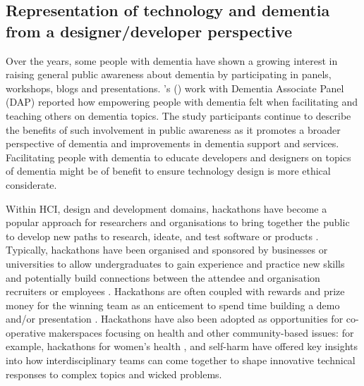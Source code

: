 \subsection{Representation of technology and dementia from a designer/developer perspective}
\label{BL:gap:engagement}
Over the years, some people with dementia have shown a growing interest in raising general public awareness about dementia by participating in panels, workshops, blogs and presentations. \citeauthor{innes2021s}'s (\citeyear{innes2021s}) work with Dementia Associate Panel (DAP) reported how empowering people with dementia felt when facilitating and teaching others on dementia topics. The study participants continue to describe the benefits of such involvement in public awareness as it promotes a broader perspective of dementia and improvements in dementia support and services. Facilitating people with dementia to educate developers and designers on topics of dementia might be of benefit to ensure technology design is more ethical considerate. 

Within HCI, design and development domains, hackathons have become a popular approach for researchers and organisations to bring together the public to develop new paths to research, ideate, and test software or products \citep{medina_angarita_what_2020}. Typically, hackathons have been organised and sponsored by businesses or universities to allow undergraduates to gain experience and practice new skills and potentially build connections between the attendee and organisation recruiters or employees \citep{hope_hackathons_2019}. Hackathons are often coupled with rewards and prize money for the winning team as an enticement to spend time building a demo and/or presentation \citep{johnson_civic_2014}. Hackathons have also been adopted as opportunities for co-operative makerspaces focusing on health and other community-based issues: for example, hackathons for women’s health \citep{paganini_engaging_2020}, and self-harm \citep{birbeck_self_2017} have offered key insights into how interdisciplinary teams can come together to shape innovative technical responses to complex topics and wicked problems. 

